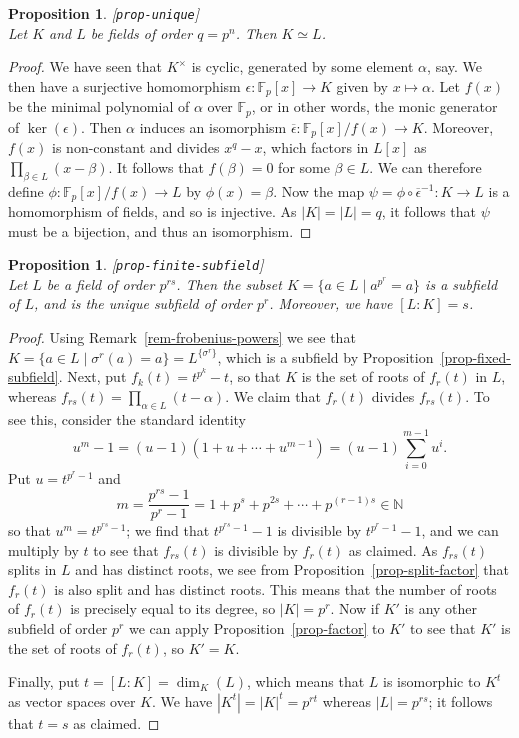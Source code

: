 \documentclass{amsart}
\newcommand{\lbl}[1]{\label{#1}\textup{[\texttt{#1}]}\ \\}
\newcommand{\lbl}{\label}
\newcommand{\N}         {{\mathbb{N}}}
\newcommand{\F}         {{\mathbb{F}}}
\newcommand{\al}        {\alpha}
\newcommand{\bt}        {\beta}
\newcommand{\ep}        {\epsilon}
\newcommand{\sg}        {\sigma}
\newcommand{\ov}[1]     {\overline{#1}}
\newcommand{\st}        {\;|\;}
\newcommand{\tm}        {\times}
\newcommand{\xra}       {\xrightarrow}
\renewcommand{\:}{\colon}
\newtheorem{proposition}[theorem]{Proposition}
\theoremstyle{definition}
\begin{document}
\begin{proposition}\lbl{prop-unique}
 Let $K$ and $L$ be fields of order $q=p^n$.  Then $K\simeq L$.
\end{proposition}
\begin{proof}
 We have seen that $K^\tm$ is cyclic, generated by some element $\al$,
 say.  We then have a surjective homomorphism $\ep\:\F_p[x]\xra{}K$
 given by $x\mapsto\al$.  Let $f(x)$ be the minimal polynomial of
 $\al$ over $\F_p$, or in other words, the monic generator of
 $\ker(\ep)$.  Then $\al$ induces an isomorphism
 $\ov{\ep}\:\F_p[x]/f(x)\xra{}K$.  Moreover, $f(x)$ is non-constant
 and divides $x^q-x$, which factors in $L[x]$ as
 $\prod_{\bt\in L}(x-\bt)$.  It follows that $f(\bt)=0$ for some
 $\bt\in L$.  We can therefore define $\phi\:\F_p[x]/f(x)\xra{}L$ by
 $\phi(x)=\bt$.  Now the map $\psi=\phi\circ\ov{\ep}^{-1}\:K\xra{}L$
 is a homomorphism of fields, and so is injective.  As $|K|=|L|=q$, it
 follows that $\psi$ must be a bijection, and thus an isomorphism.
\end{proof}

\begin{proposition}\lbl{prop-finite-subfield}
 Let $L$ be a field of order $p^{rs}$.  Then the subset
 $K=\{a\in L\st a^{p^r}=a\}$ is a subfield of $L$, and is the unique
 subfield of order $p^r$.  Moreover, we have $[L:K]=s$.
\end{proposition}
\begin{proof}
 Using Remark~\ref{rem-frobenius-powers} we see that
 $K=\{a\in L\st\sg^r(a)=a\}=L^{\{\sg^r\}}$, which is a subfield by
 Proposition~\ref{prop-fixed-subfield}.   Next, put
 $f_k(t)=t^{p^k}-t$, so that $K$ is the set of roots of $f_r(t)$ in
 $L$, whereas $f_{rs}(t)=\prod_{\al\in L}(t-\al)$.   We claim that
 $f_r(t)$ divides $f_{rs}(t)$.  To see this, consider the standard
 identity  
 \[ u^m-1 = (u-1)(1+u+\dotsb+u^{m-1})=(u-1)\sum_{i=0}^{m-1}u^i. \]
 Put $u=t^{p^r-1}$ and 
 \[ m = \frac{p^{rs}-1}{p^r-1} = 1+p^s+p^{2s}+\dotsb+p^{(r-1)s}\in\N
 \]
 so that $u^m=t^{p^{rs}-1}$; we find that $t^{p^{rs}-1}-1$ is
 divisible by $t^{p^r-1}-1$, and we can multiply by $t$ to see that
 $f_{rs}(t)$ is divisible by $f_r(t)$ as claimed.  As $f_{rs}(t)$
 splits in $L$ and has distinct roots, we see from
 Proposition~\ref{prop-split-factor} that $f_r(t)$ is also split and
 has distinct roots.  This means that the number of roots of $f_r(t)$
 is precisely equal to its degree, so $|K|=p^r$.  Now if $K'$ is any
 other subfield of order $p^r$ we can apply
 Proposition~\ref{prop-factor} to $K'$ to see that $K'$ is the set of
 roots of $f_r(t)$, so $K'=K$.  

 Finally, put $t=[L:K]=\dim_K(L)$, which means that $L$ is isomorphic
 to $K^t$ as vector spaces over $K$.  We have $|K^t|=|K|^t=p^{rt}$
 whereas $|L|=p^{rs}$; it follows that $t=s$ as claimed.
\end{proof}
\end{document}

